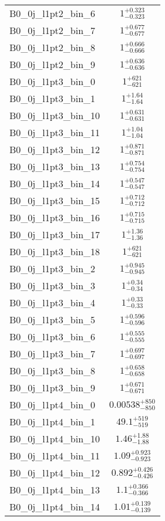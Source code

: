 \begin{tabular}{|l|c|}
B0\_0j\_l1pt2\_bin\_6 & $1^{+0.323}_{-0.323}$ \\
B0\_0j\_l1pt2\_bin\_7 & $1^{+0.677}_{-0.677}$ \\
B0\_0j\_l1pt2\_bin\_8 & $1^{+0.666}_{-0.666}$ \\
B0\_0j\_l1pt2\_bin\_9 & $1^{+0.636}_{-0.636}$ \\
B0\_0j\_l1pt3\_bin\_0 & $1^{+621}_{-621}$ \\
B0\_0j\_l1pt3\_bin\_1 & $1^{+1.64}_{-1.64}$ \\
B0\_0j\_l1pt3\_bin\_10 & $1^{+0.631}_{-0.631}$ \\
B0\_0j\_l1pt3\_bin\_11 & $1^{+1.04}_{-1.04}$ \\
B0\_0j\_l1pt3\_bin\_12 & $1^{+0.871}_{-0.871}$ \\
B0\_0j\_l1pt3\_bin\_13 & $1^{+0.754}_{-0.754}$ \\
B0\_0j\_l1pt3\_bin\_14 & $1^{+0.547}_{-0.547}$ \\
B0\_0j\_l1pt3\_bin\_15 & $1^{+0.712}_{-0.712}$ \\
B0\_0j\_l1pt3\_bin\_16 & $1^{+0.715}_{-0.715}$ \\
B0\_0j\_l1pt3\_bin\_17 & $1^{+1.36}_{-1.36}$ \\
B0\_0j\_l1pt3\_bin\_18 & $1^{+621}_{-621}$ \\
B0\_0j\_l1pt3\_bin\_2 & $1^{+0.945}_{-0.945}$ \\
B0\_0j\_l1pt3\_bin\_3 & $1^{+0.34}_{-0.34}$ \\
B0\_0j\_l1pt3\_bin\_4 & $1^{+0.33}_{-0.33}$ \\
B0\_0j\_l1pt3\_bin\_5 & $1^{+0.596}_{-0.596}$ \\
B0\_0j\_l1pt3\_bin\_6 & $1^{+0.555}_{-0.555}$ \\
B0\_0j\_l1pt3\_bin\_7 & $1^{+0.697}_{-0.697}$ \\
B0\_0j\_l1pt3\_bin\_8 & $1^{+0.658}_{-0.658}$ \\
B0\_0j\_l1pt3\_bin\_9 & $1^{+0.671}_{-0.671}$ \\
B0\_0j\_l1pt4\_bin\_0 & $0.00538^{+850}_{-850}$ \\
B0\_0j\_l1pt4\_bin\_1 & $49.1^{+519}_{-519}$ \\
B0\_0j\_l1pt4\_bin\_10 & $1.46^{+1.88}_{-1.88}$ \\
B0\_0j\_l1pt4\_bin\_11 & $1.09^{+0.923}_{-0.923}$ \\
B0\_0j\_l1pt4\_bin\_12 & $0.892^{+0.426}_{-0.426}$ \\
B0\_0j\_l1pt4\_bin\_13 & $1.1^{+0.366}_{-0.366}$ \\
B0\_0j\_l1pt4\_bin\_14 & $1.01^{+0.139}_{-0.139}$ \\

\end{tabular}
